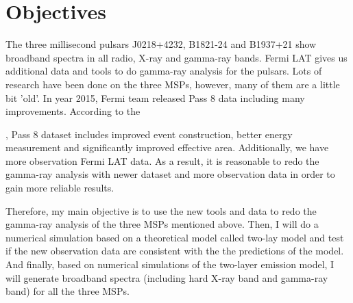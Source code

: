 \documentclass[12pt]{report}
\newcommand{\blackhref}[2]{
  \href{#1}{\color{black}{\textit{\small #2}}}
}
\begin{document}
    \section{Objectives}
            The three millisecond pulsars J0218+4232, B1821-24 and B1937+21 show 
            broadband spectra in all radio, X-ray and gamma-ray bands. Fermi LAT gives us 
            additional data and tools to do gamma-ray analysis for the pulsars. Lots of research 
            have been done on the three MSPs, however, many of them are a little bit 'old'. In year 
            2015, Fermi team released Pass 8 data including many improvements. According to the 
            \blackhref{https://fermi.gsfc.nasa.gov/ssc/data/analysis/documentation/Pass8_usage.html}{Fermi official website},
            Pass 8 dataset includes improved event construction, better energy measurement and 
            significantly improved effective area. Additionally, we have more observation Fermi LAT
            data. As a result, it is reasonable to redo the gamma-ray analysis with newer dataset and 
            more observation data in order to gain more reliable results. 

            Therefore, my main objective is to use the new tools and data to redo the gamma-ray
            analysis of the three MSPs mentioned above. 
            Then, I will do a numerical simulation based on a theoretical model called two-lay model and test if the new observation 
            data are consistent with the the predictions of the model. And finally, based on numerical simulations 
            of the two-layer emission model, I will generate broadband spectra (including hard X-ray band 
            and gamma-ray band) for all the three MSPs. 

              
\end{document}
